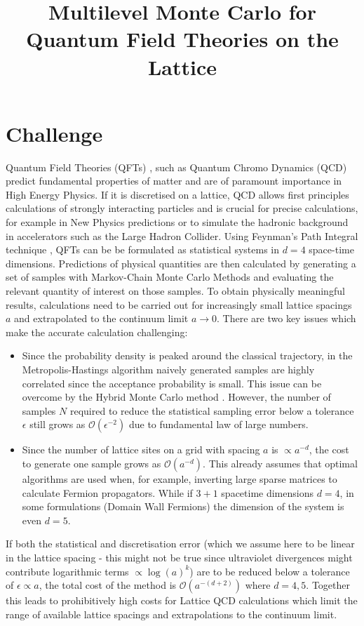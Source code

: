 \documentclass[11pt]{article}
\title{Multilevel Monte Carlo for Quantum Field Theories on the Lattice}
\begin{document}
\maketitle
\section{Challenge}
Quantum Field Theories (QFTs) \cite{Peskin1995}, such as Quantum Chromo Dynamics (QCD) predict fundamental properties of matter and are of paramount importance in High Energy Physics. If it is discretised on a lattice, QCD allows first principles calculations of strongly interacting particles and is crucial for precise calculations, for example in New Physics predictions or to simulate the hadronic background in accelerators such as the Large Hadron Collider.
Using Feynman's Path Integral technique \cite{Feynman2010}, QFTs can be be formulated as statistical systems in $d=4$ space-time dimensions. Predictions of physical quantities are then calculated by generating a set of samples with Markov-Chain Monte Carlo Methods and evaluating the relevant quantity of interest on those samples. To obtain physically meaningful results, calculations need to be carried out for increasingly small lattice spacings $a$ and extrapolated to the continuum limit $a\rightarrow 0$. There are two key issues which make the accurate calculation challenging:
\begin{itemize}
\item Since the probability density is peaked around the classical trajectory, in the Metropolis-Hastings algorithm naively generated samples are highly correlated since the acceptance probability is small. This issue can be overcome by the Hybrid Monte Carlo method \cite{Duane1987}. However, the number of samples $N$ required to reduce the statistical sampling error below a tolerance $\epsilon$ still grows as $\mathcal{O}(\epsilon^{-2})$ due to fundamental law of large numbers. 
\item Since the number of lattice sites on a grid with spacing $a$ is $\propto a^{-d}$, the cost to generate one sample grows as $\mathcal{O}(a^{-d})$. This already assumes that optimal algorithms are used when, for example, inverting large sparse matrices to calculate Fermion propagators. While if $3+1$ spacetime dimensions $d=4$, in some formulations (Domain Wall Fermions) the dimension of the system is even $d=5$.
\end{itemize}
If both the statistical and discretisation error (which we assume here to be linear in the lattice spacing - this might not be true since ultraviolet divergences might contribute logarithmic terms $\propto \log(a)^k$) are to be reduced below a tolerance of $\epsilon\propto a$, the total cost of the method is $\mathcal{O}(a^{-(d+2)})$ where $d=4,5$. Together this leads to prohibitively high costs for Lattice QCD calculations which limit the range of available lattice spacings and extrapolations to the continuum limit.
\end{document}
